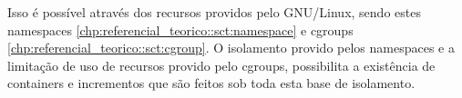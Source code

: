 Isso é possível através dos recursos providos pelo GNU/Linux, sendo estes namespaces \ref{chp:referencial_teorico::sct:namespace} e cgroups \ref{chp:referencial_teorico::sct:cgroup}. O isolamento provido pelos namespaces e a limitação de uso de recursos provido pelo cgroups, possibilita a existência de containers e incrementos que são feitos sob toda esta base de isolamento.
